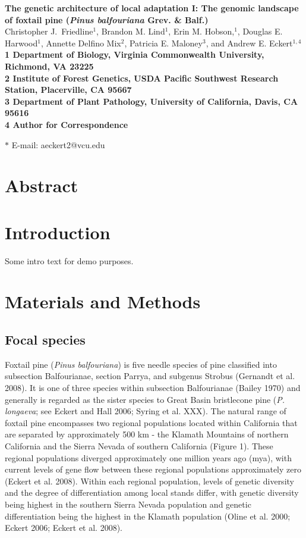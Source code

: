 \documentclass[11pt]{article}
\begin{document}
\begin{flushleft} 
{\Large \textbf{The genetic architecture of local adaptation I: The genomic landscape of foxtail pine (\textit{Pinus balfouriana} Grev. \& Balf.)}}
\\
Christopher J.\ Friedline$^{1}$, 
Brandon M. Lind$^{1}$,
Erin M. Hobson,$^{1}$,
Douglas E. Harwood$^{1}$, 
Annette Delfino Mix$^{2}$,
Patricia E. Maloney$^{3}$, and
Andrew E. Eckert$^{1,4}$
\\
\bf{1} Department of Biology, Virginia Commonwealth University, Richmond, VA 23225
\\
\bf{2} Institute of Forest Genetics, USDA Pacific Southwest Research Station, Placerville, 
CA 95667
\\
\bf{3} Department of Plant Pathology, University of California, Davis, CA 95616
\\
\bf{4} Author for Correspondence

$\ast$ E-mail: aeckert2@vcu.edu
\end{flushleft}

\section{Abstract}

\section{Introduction}
Some intro text for demo purposes.

\section{Materials and Methods}

\subsection{Focal species}
Foxtail pine (\textit{Pinus balfouriana}) is five needle species of pine classified into 
subsection Balfourianae, section Parrya, and subgenus Strobus (Gernandt et al. 2008). It 
is one of three species within subsection Balfourianae (Bailey 1970) and generally is 
regarded as the sister species to Great Basin bristlecone pine (\textit{P. longaeva}; see 
Eckert and Hall 2006; Syring et al. XXX). The natural range of foxtail pine encompasses two 
regional populations located within California that are separated by approximately 500 km - 
the Klamath Mountains of northern California and the Sierra Nevada of southern California 
(Figure 1). These regional populations diverged approximately one million years ago (mya), 
with current levels of gene flow between these regional populations approximately zero 
(Eckert et al. 2008). Within each regional population, levels of genetic diversity and the 
degree of differentiation among local stands differ, with genetic diversity being highest in 
the southern Sierra Nevada population and genetic differentiation being the highest in the 
Klamath population (Oline et al. 2000; Eckert 2006; Eckert et al. 2008).
\end{document}
